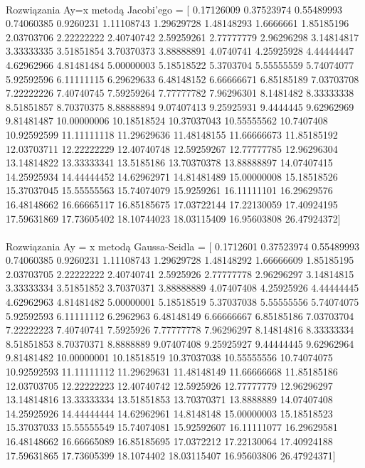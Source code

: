 \documentclass{article}
\begin{document}
\paragraph{}
Rozwiązania Ay=x metodą Jacobi'ego = 
[ 0.17126009  0.37523974  0.55489993  0.74060385  0.9260231   1.11108743
  1.29629728  1.48148293  1.6666661   1.85185196  2.03703706  2.22222222
  2.40740742  2.59259261  2.77777779  2.96296298  3.14814817  3.33333335
  3.51851854  3.70370373  3.88888891  4.0740741   4.25925928  4.44444447
  4.62962966  4.81481484  5.00000003  5.18518522  5.3703704   5.55555559
  5.74074077  5.92592596  6.11111115  6.29629633  6.48148152  6.66666671
  6.85185189  7.03703708  7.22222226  7.40740745  7.59259264  7.77777782
  7.96296301  8.1481482   8.33333338  8.51851857  8.70370375  8.88888894
  9.07407413  9.25925931  9.4444445   9.62962969  9.81481487 10.00000006
 10.18518524 10.37037043 10.55555562 10.7407408  10.92592599 11.11111118
 11.29629636 11.48148155 11.66666673 11.85185192 12.03703711 12.22222229
 12.40740748 12.59259267 12.77777785 12.96296304 13.14814822 13.33333341
 13.5185186  13.70370378 13.88888897 14.07407415 14.25925934 14.44444452
 14.62962971 14.81481489 15.00000008 15.18518526 15.37037045 15.55555563
 15.74074079 15.9259261  16.11111101 16.29629576 16.48148662 16.66665117
 16.85185675 17.03722144 17.22130059 17.40924195 17.59631869 17.73605402
 18.10744023 18.03115409 16.95603808 26.47924372]
\pagebreak
\paragraph{}
Rozwiązania Ay = x metodą Gaussa-Seidla =
[ 0.1712601   0.37523974  0.55489993  0.74060385  0.9260231   1.11108743
  1.29629728  1.48148292  1.66666609  1.85185195  2.03703705  2.22222222
  2.40740741  2.5925926   2.77777778  2.96296297  3.14814815  3.33333334
  3.51851852  3.70370371  3.88888889  4.07407408  4.25925926  4.44444445
  4.62962963  4.81481482  5.00000001  5.18518519  5.37037038  5.55555556
  5.74074075  5.92592593  6.11111112  6.2962963   6.48148149  6.66666667
  6.85185186  7.03703704  7.22222223  7.40740741  7.5925926   7.77777778
  7.96296297  8.14814816  8.33333334  8.51851853  8.70370371  8.8888889 
  9.07407408  9.25925927  9.44444445  9.62962964  9.81481482 10.00000001
 10.18518519 10.37037038 10.55555556 10.74074075 10.92592593 11.11111112
 11.29629631 11.48148149 11.66666668 11.85185186 12.03703705 12.22222223
 12.40740742 12.5925926  12.77777779 12.96296297 13.14814816 13.33333334
 13.51851853 13.70370371 13.8888889  14.07407408 14.25925926 14.44444444
 14.62962961 14.8148148  15.00000003 15.18518523 15.37037033 15.55555549
 15.74074081 15.92592607 16.11111077 16.29629581 16.48148662 16.66665089
 16.85185695 17.0372212  17.22130064 17.40924188 17.59631865 17.73605399
 18.1074402  18.03115407 16.95603806 26.47924371]
\end{document}
